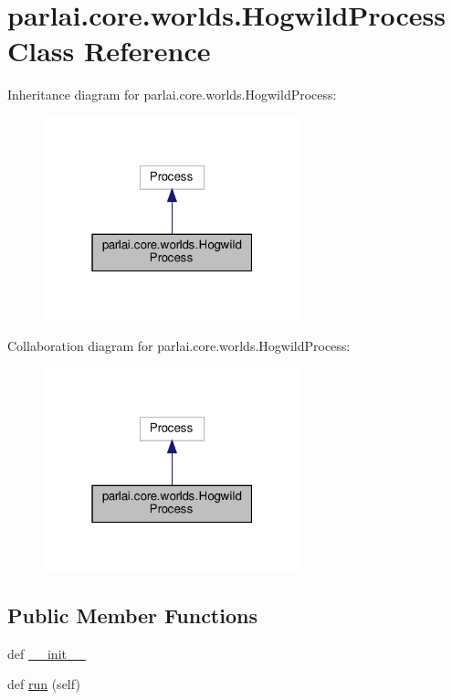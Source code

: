 \hypertarget{classparlai_1_1core_1_1worlds_1_1HogwildProcess}{}\section{parlai.\+core.\+worlds.\+Hogwild\+Process Class Reference}
\label{classparlai_1_1core_1_1worlds_1_1HogwildProcess}


Inheritance diagram for parlai.\+core.\+worlds.\+Hogwild\+Process\+:\nopagebreak
\begin{figure}[H]
\begin{center}
\leavevmode
\includegraphics[width=211pt]{de/d43/classparlai_1_1core_1_1worlds_1_1HogwildProcess__inherit__graph}
\end{center}
\end{figure}


Collaboration diagram for parlai.\+core.\+worlds.\+Hogwild\+Process\+:\nopagebreak
\begin{figure}[H]
\begin{center}
\leavevmode
\includegraphics[width=211pt]{de/d3d/classparlai_1_1core_1_1worlds_1_1HogwildProcess__coll__graph}
\end{center}
\end{figure}
\subsection*{Public Member Functions}
\begin{DoxyCompactItemize}
\item 
def \hyperlink{classparlai_1_1core_1_1worlds_1_1HogwildProcess_a23dbb2d3afb25e1a7d71c8618e5dd7ec}{\+\_\+\+\_\+init\+\_\+\+\_\+}
\item 
def \hyperlink{classparlai_1_1core_1_1worlds_1_1HogwildProcess_a749caf3085cb7b373db66b6f92567290}{run} (self)
\end{DoxyCompactItemize}
